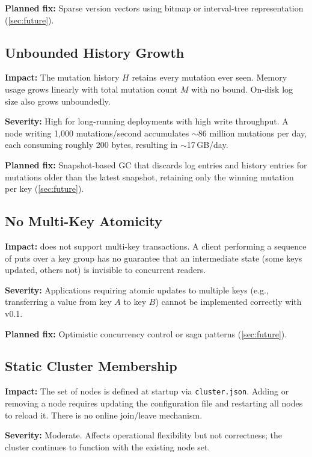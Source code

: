 \textbf{Planned fix:} Sparse version vectors using bitmap or interval-tree
representation (\cref{sec:future}).

\subsection{Unbounded History Growth}

\textbf{Impact:} The mutation history $H$ retains every mutation ever seen.
Memory usage grows linearly with total mutation count $M$ with no bound.
On-disk log size also grows unboundedly.

\textbf{Severity:} High for long-running deployments with high write throughput.
A node writing 1,000 mutations/second accumulates $\sim$86 million mutations
per day, each consuming roughly 200 bytes, resulting in $\sim$17\,GB/day.

\textbf{Planned fix:} Snapshot-based GC that discards log entries and history
entries for mutations older than the latest snapshot, retaining only
the winning mutation per key (\cref{sec:future}).

\subsection{No Multi-Key Atomicity}

\textbf{Impact:} \pebble{} does not support multi-key transactions. A client
performing a sequence of puts over a key group has no guarantee that an
intermediate state (some keys updated, others not) is invisible to concurrent
readers.

\textbf{Severity:} Applications requiring atomic updates to multiple keys (e.g.,
transferring a value from key $A$ to key $B$) cannot be implemented correctly
with \pebble{} v0.1.

\textbf{Planned fix:} Optimistic concurrency control or saga patterns
(\cref{sec:future}).

\subsection{Static Cluster Membership}

\textbf{Impact:} The set of nodes is defined at startup via \texttt{cluster.json}.
Adding or removing a node requires updating the configuration file and
restarting all nodes to reload it. There is no online join/leave mechanism.

\textbf{Severity:} Moderate. Affects operational flexibility but not correctness;
the cluster continues to function with the existing node set.

